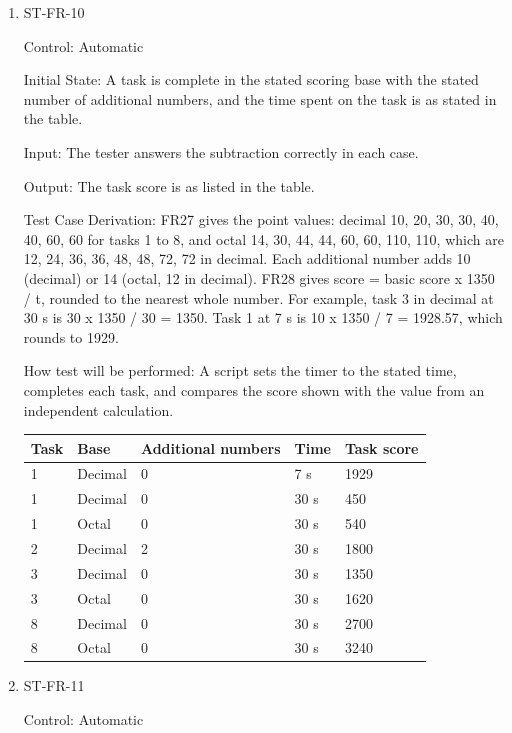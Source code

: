 \documentclass[12pt, titlepage]{article}
\begin{document}
\begin{enumerate}

\item{ST-FR-10\\}

Control: Automatic

Initial State: A task is complete in the stated scoring base with the stated number of additional numbers, and the time spent on the task is as stated in the table.

Input: The tester answers the subtraction correctly in each case.

Output: The task score is as listed in the table.

Test Case Derivation: FR27 gives the point values: decimal 10, 20, 30, 30, 40, 40, 60, 60 for tasks 1 to 8, and octal 14, 30, 44, 44, 60, 60, 110, 110, which are 12, 24, 36, 36, 48, 48, 72, 72 in decimal. Each additional number adds 10 (decimal) or 14 (octal, 12 in decimal). FR28 gives score = basic score x 1350 / t, rounded to the nearest whole number. For example, task 3 in decimal at 30 s is 30 x 1350 / 30 = 1350. Task 1 at 7 s is 10 x 1350 / 7 = 1928.57, which rounds to 1929.

How test will be performed: A script sets the timer to the stated time, completes each task, and compares the score shown with the value from an independent calculation.

\begin{center}
\begin{tabular}{lllll}
\toprule
\textbf{Task} & \textbf{Base} & \textbf{Additional numbers} & \textbf{Time} & \textbf{Task score}\\
\midrule
1 & Decimal & 0 & 7 s & 1929\\
1 & Decimal & 0 & 30 s & 450\\
1 & Octal & 0 & 30 s & 540\\
2 & Decimal & 2 & 30 s & 1800\\
3 & Decimal & 0 & 30 s & 1350\\
3 & Octal & 0 & 30 s & 1620\\
8 & Decimal & 0 & 30 s & 2700\\
8 & Octal & 0 & 30 s & 3240\\
\bottomrule
\end{tabular}
\end{center}

\item{ST-FR-11\\}

Control: Automatic


\end{enumerate}
\end{document}

